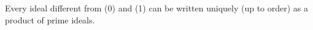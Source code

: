 Every ideal different from (0) and (1) can be written uniquely (up to order) as a product of prime ideals.
